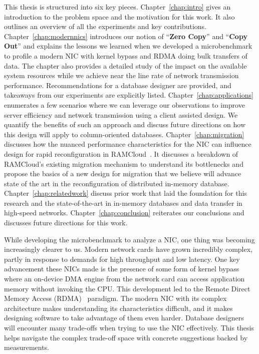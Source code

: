 This thesis is structured into six key pieces. 
Chapter~\ref{chap:intro} gives an introduction to the problem space and the motivation for this work. 
It also outlines an overview of all the experiments and key contributions. Chapter~\ref{chap:modernnics} introduces 
our notion of \enquote{\textbf{Zero Copy}} and \enquote{\textbf{Copy Out}} and explains 
the lessons we learned when we developed a microbenchmark to profile a modern NIC with kernel bypass and RDMA doing bulk transfers 
of data. The chapter also provides a detailed study of the impact on the available system resources while we achieve 
near the line rate of network transmission performance. Recommendations for a database designer are provided, and takeaways 
from our experiments are explicitly listed. Chapter~\ref{chap:applications} enumerates a few scenarios where we can 
leverage our observations to improve server efficiency and network transmission using a client assisted design.
 We quantify the benefits of such an approach and discuss future directions on how this design will apply to column-oriented 
 databases. Chapter~\ref{chap:migration} discusses how the nuanced performance characteristics for the NIC can influence 
design for rapid reconfiguration in RAMCloud~\cite{ramcloud}. It discusses a breakdown of RAMCloud’s existing migration mechanism to understand its bottlenecks
and propose the basics of a new design for migration that we believe will advance state of the art
in the reconfiguration of distributed in-memory database. Chapter~\ref{chap:relatedwork} discuss prior work that laid the 
foundation for this research and the state-of-the-art in in-memory databases and data transfer in high-speed networks. 
Chapter~\ref{chap:conclusion} reiterates our conclusions and discusses future directions for this work.

While developing the microbenchmark to analyze a NIC, one thing was becoming increasingly clearer to us.
Modern network cards have grown incredibly complex, partly in response to
demands for high throughput and low latency. One key advancement these NICs made 
is the presence of some form of kernel bypass where an on-device DMA engine from the network card 
can access application memory without invoking the CPU. This development led to the Remote 
Direct Memory Access (RDMA)~\cite{rdmapatent} paradigm. The modern NIC with its complex architecture
makes understanding its characteristics difficult, and it makes designing software to take advantage
of them even harder. Database designers will encounter many trade-offs when trying to use the NIC effectively. This thesis 
helps navigate the complex trade-off space with concrete suggestions backed by measurements.

